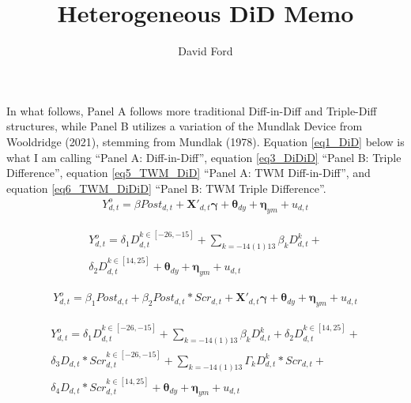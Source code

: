 \documentclass[11pt,a4paper]{article}
\begin{document}
\title{Heterogeneous DiD Memo}
\author{David Ford}
\maketitle

In what follows, Panel A follows more traditional Diff-in-Diff and Triple-Diff structures, while Panel B utilizes a variation of the Mundlak Device from Wooldridge (2021), stemming from Mundlak (1978). Equation \ref{eq1_DiD} below is what I am calling ``Panel A: Diff-in-Diff'', equation \ref{eq3_DiDiD} ``Panel B: Triple Difference'', equation \ref{eq5_TWM_DiD} ``Panel A: TWM Diff-in-Diff'', and equation \ref{eq6_TWM_DiDiD} ``Panel B: TWM Triple Difference''. \\

\begin{equation}
	\begin{split}
		Y^{o}_{d,t} = \beta Post_{d,t} + \boldsymbol{X'}_{d,t} \boldsymbol{\gamma} + \boldsymbol{\theta}_{dy} + \boldsymbol{\eta}_{ym} + u_{d,t} 
	\label{eq1_DiD}
	\end{split}
\end{equation}

\begin{equation}
	\begin{split}
		Y^{o}_{d,t} = \delta_{1} D^{k\in[-26,-15]}_{d,t} + \sum_{k=-14(1)13} \beta_{k}D^{k}_{d,t} + \\ 
		\delta_{2} D^{k\in[14,25]}_{d,t} + \boldsymbol{\theta}_{dy} + \boldsymbol{\eta}_{ym} + u_{d,t}
            \label{eq2_estudy}
        \end{split}
\end{equation}

\begin{equation} 
	\begin{split}
		Y^{o}_{d,t} = \beta_{1} Post_{d,t} + \beta_{2} Post_{d,t}*Scr_{d,t} + \boldsymbol{X'}_{d,t} \boldsymbol{\gamma} + \boldsymbol{\theta}_{dy} + \boldsymbol{\eta}_{ym} + u_{d,t} 
	\label{eq3_DiDiD}
	\end{split}
\end{equation}

\begin{equation}
	\begin{split}
		Y^{o}_{d,t} = \delta_{1} D^{k\in[-26,-15]}_{d,t} + \sum_{k=-14(1)13} \beta_{k}D^{k}_{d,t} + \delta_{2} D^{k\in[14,25]}_{d,t} + \\
		\delta_{3} D_{d,t}*Scr_{d,t}^{k\in[-26,-15]} + \sum_{k=-14(1)13} \Gamma_{k}D^{k}_{d,t}*Scr_{d,t} + \\
		\delta_{4} D_{d,t}*Scr_{d,t}^{k\in[14,25]} + \boldsymbol{\theta}_{dy} + \boldsymbol{\eta}_{ym} + u_{d,t}
	\label{eq4_estudy_int}
	\end{split}
\end{equation}
\end{document}
